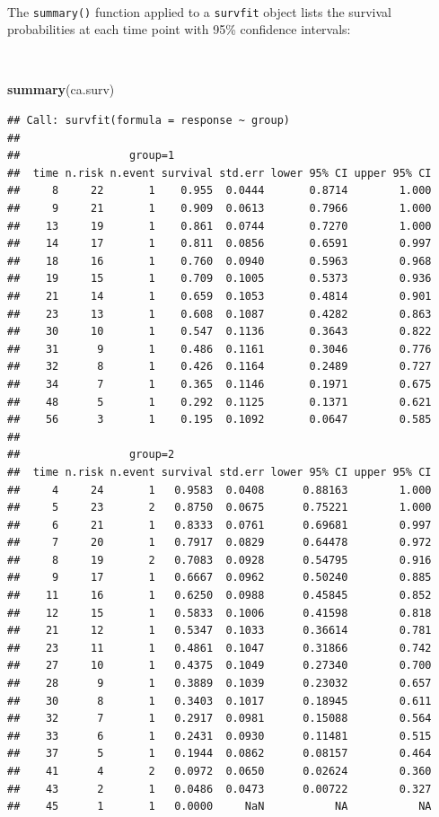 \documentclass[12pt,a4paper]{book}
\newenvironment{Shaded}{\begin{snugshade}}{\end{snugshade}}
\newcommand{\KeywordTok}[1]{\textcolor[rgb]{0.13,0.29,0.53}{\textbf{#1}}}
\newcommand{\NormalTok}[1]{#1}
\theoremstyle{definition}
\theoremstyle{definition}
\theoremstyle{definition}
\theoremstyle{remark}
\begin{document}
~

The \texttt{summary()} function applied to a \texttt{survfit} object
lists the survival probabilities at each time point with 95\% confidence
intervals:

~

\begin{Shaded}
\begin{Highlighting}[]
\KeywordTok{summary}\NormalTok{(ca.surv)}
\end{Highlighting}
\end{Shaded}

\begin{verbatim}
## Call: survfit(formula = response ~ group)
## 
##                 group=1 
##  time n.risk n.event survival std.err lower 95% CI upper 95% CI
##     8     22       1    0.955  0.0444       0.8714        1.000
##     9     21       1    0.909  0.0613       0.7966        1.000
##    13     19       1    0.861  0.0744       0.7270        1.000
##    14     17       1    0.811  0.0856       0.6591        0.997
##    18     16       1    0.760  0.0940       0.5963        0.968
##    19     15       1    0.709  0.1005       0.5373        0.936
##    21     14       1    0.659  0.1053       0.4814        0.901
##    23     13       1    0.608  0.1087       0.4282        0.863
##    30     10       1    0.547  0.1136       0.3643        0.822
##    31      9       1    0.486  0.1161       0.3046        0.776
##    32      8       1    0.426  0.1164       0.2489        0.727
##    34      7       1    0.365  0.1146       0.1971        0.675
##    48      5       1    0.292  0.1125       0.1371        0.621
##    56      3       1    0.195  0.1092       0.0647        0.585
## 
##                 group=2 
##  time n.risk n.event survival std.err lower 95% CI upper 95% CI
##     4     24       1   0.9583  0.0408      0.88163        1.000
##     5     23       2   0.8750  0.0675      0.75221        1.000
##     6     21       1   0.8333  0.0761      0.69681        0.997
##     7     20       1   0.7917  0.0829      0.64478        0.972
##     8     19       2   0.7083  0.0928      0.54795        0.916
##     9     17       1   0.6667  0.0962      0.50240        0.885
##    11     16       1   0.6250  0.0988      0.45845        0.852
##    12     15       1   0.5833  0.1006      0.41598        0.818
##    21     12       1   0.5347  0.1033      0.36614        0.781
##    23     11       1   0.4861  0.1047      0.31866        0.742
##    27     10       1   0.4375  0.1049      0.27340        0.700
##    28      9       1   0.3889  0.1039      0.23032        0.657
##    30      8       1   0.3403  0.1017      0.18945        0.611
##    32      7       1   0.2917  0.0981      0.15088        0.564
##    33      6       1   0.2431  0.0930      0.11481        0.515
##    37      5       1   0.1944  0.0862      0.08157        0.464
##    41      4       2   0.0972  0.0650      0.02624        0.360
##    43      2       1   0.0486  0.0473      0.00722        0.327
##    45      1       1   0.0000     NaN           NA           NA
\end{verbatim}
\end{document}
